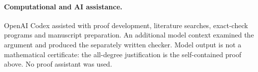 \documentclass[11pt]{article}
\begin{document}
\paragraph{Computational and AI assistance.}
OpenAI Codex assisted with proof development, literature searches, exact-check
programs and manuscript preparation. An additional model context examined
the argument and produced the separately written checker. Model output is
not a mathematical certificate: the all-degree justification is the
self-contained proof above. No proof assistant was used.


\small


\end{document}
